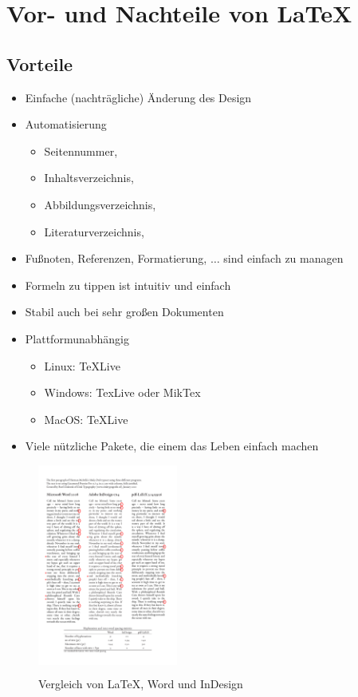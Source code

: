 \documentclass[
    ngerman,
    accentcolor=3b,
    dark_mode,
    fontsize= 12pt,
    a4paper,
    aspectratio=169,
    colorback=true,
    fancy_row_colors,
    leqno,
    fleqn,
    boxarc=3pt,
    fleqn,
]{algoslides}
\begin{document}
    \section{Vor- und Nachteile von \LaTeX}\label{2}\label{2}
    \subsection{Vorteile}\label{2.1}\label{2.1}
    \begin{frame}
        \slidehead{}
        \begin{itemize}
            \item Einfache (nachträgliche) Änderung des Design
            \item Automatisierung
                \begin{itemize}
                    \item Seitennummer,
                    \item Inhaltsverzeichnis,
                    \item Abbildungsverzeichnis,
                    \item Literaturverzeichnis,
                \end{itemize}
            \item Fußnoten, Referenzen, Formatierung, $\dots$ sind einfach zu managen
            \item Formeln zu tippen ist intuitiv und einfach
            \item Stabil auch bei sehr großen Dokumenten
            \item Plattformunabhängig\begin{itemize}
                    \item Linux: TeXLive
                    \item Windows: TexLive oder MikTex
                    \item MacOS: TeXLive
                \end{itemize}
            \item Viele nützliche Pakete, die einem das Leben einfach machen
        \end{itemize}
    \end{frame}
    \begin{frame}[c]
        \begin{figure}[ht!]
            \centering
            \colorbox{white}{\includegraphics[height=6.5cm]{LaTeX vs Word vs Indesign.pdf}}
            \caption{Vergleich von \LaTeX, Word und InDesign}
            \label{fig:LaTeX-Vergleich}
        \end{figure}
    \end{frame}
\end{document}
